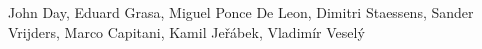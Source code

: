 {\contribfont
    John Day,
    Eduard Grasa,
    Miguel Ponce De Leon,
    Dimitri Staessens,
    Sander Vrijders,
    Marco Capitani,
    Kamil Je\v{r}\'{a}bek,
    Vladim\'{i}r Vesel\'{y}
}
